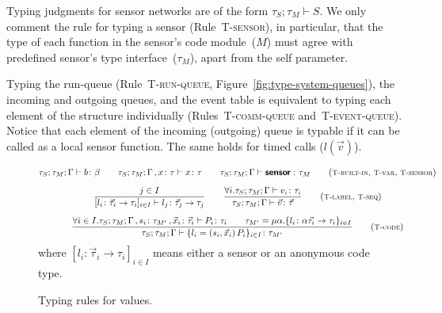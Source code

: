 \documentclass[copyright,creativecommons]{eptcs}
\newcommand{\keyw}[1]{\textbf{\textsf{#1}}\,}
\newcommand{\branek}{\keyw{sensor}}
\newcommand{\abstr}[2]{({#1})\,{#2}}
\newcommand{\msg}[2]{{#1}({#2})}
\newcommand{\msgd}{\msg l {\vec v}}
\def\obj#1{\{#1\}}
\def\senObj#1{[#1]}
\newcommand{\functionType}[2]{{#1} \rightarrow {#2}}
\newcommand{\recType}[2]{\mu {#1}.{#2}}
\newcommand{\disj}{\operatorname{,}}
\newcommand{\mkTrule}[1]{{\footnotesize \textsc{T-#1}}}
\newcommand{\type}{\vdash}
\newcommand{\TrunQueue}{\mkTrule{run-queue}}
\newcommand{\TcommQueue}{\mkTrule{comm-queue}}
\newcommand{\TeventQueue}{\mkTrule{event-queue}}
\newcommand{\TSsensor}{\mkTrule{sensor}}
\newcommand{\TVvar}{\mkTrule{var}}
\newcommand{\TVlabel}{\mkTrule{label}}
\newcommand{\TVseq}{\mkTrule{seq}}
\newcommand{\TVsensor}{\mkTrule{sensor}}
\newcommand{\Tcode}{\mkTrule{code}}
\newcommand{\Tbin}{\mkTrule{built-in}}
\newcommand{\seqSets}[3]{{#1}; {#2}; {#3}}
\newcommand{\seqSetsd}{\seqSets {\tau_S} {\tau_M} {\Gamma}}
\newcommand{\rulespace}{0.2cm}
\begin{document}
Typing judgments for sensor networks are of the form $\tau_S;
\tau_M \type S$. We only comment the rule for typing a sensor
(Rule~\TSsensor{}), in particular, that the type of each function 
in the sensor's code module~($M$) must agree with predefined 
sensor's type interface~($\tau_M$), apart from the self parameter.

Typing the run-queue (Rule~\TrunQueue,
Figure~\ref{fig:type-system-queues}), the incoming and outgoing
queues, and the event table is equivalent to typing each element of
the structure individually (Rules~\TcommQueue{} and~\TeventQueue{}).
Notice that each element of the incoming (outgoing) queue is typable if it
can be called as a local sensor function. The same holds for timed calls ($\msgd$).



\begin{figure}
  \begin{gather*}
    \seqSetsd \type b \colon \beta
    \qquad
    \seqSetsd \disj x \colon \tau \type x \colon \tau
    \qquad
    \seqSetsd \type \branek \colon \tau_M
    \tag{\Tbin, \TVvar, \TVsensor}
    \\[\rulespace]
    \frac{
      j \in I
    }
    {
      \senObj{l_i \colon \functionType {\vec \tau_i} {\tau_i}}_{i \in I} 
           \type l_j \colon \functionType {\vec \tau_j} {\tau_j}
    }
    \qquad
    \frac{
      \forall i. \seqSetsd \type v_i \colon \tau_i
    }
    {
      \seqSetsd \type \vec v \colon \vec \tau
    }
    \tag{\TVlabel, \TVseq}
    \\[\rulespace]
   \frac{
     \forall i \in I.\seqSetsd
     \disj s_i \colon \tau_{M'} \disj \vec x_i \colon \vec \tau_i \type P_i \colon \tau_i
     \qquad 
     \tau_{M'} = \recType \alpha {\obj{l_i \colon 
         \functionType{\alpha \vec{\tau_i}} \tau_i}_{i \in I}}
   }
   {
     \seqSetsd \type \obj{l_i = {\abstr {s_i,\vec x_i}{P_i}}}_{i \in I} \colon \tau_{M'}
   }
   \tag{\Tcode}
 \end{gather*}
 \center where $\senObj{l_i \colon \functionType {\vec \tau_i} {\tau_i}}_{i
   \in I} $ means either a sensor or an anonymous code type.
\caption{Typing rules 
for values.}
\label{fig:type-system-values}
\end{figure}
\end{document}
